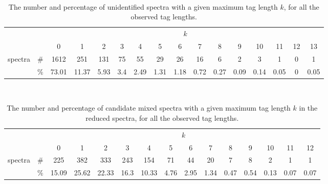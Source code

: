 \documentclass{article}
\begin{document}
\begin{table}[h]
\vspace{3mm}\
{\centering
\begin{center}
\begin{tabular}{|c|c|
c|c|c|c|c|c|c|c|c|c|c|c|c|c|}
  \hline
  \multicolumn{2}{|c|}{} & \multicolumn{ 14}{|c|}{$k$} \\
  \cline{3-16}
  \multicolumn{2}{|c|}{} 
 & 0 & 1 & 2 & 3 & 4 & 5 & 6 & 7 & 8 & 9 & 10 & 11 & 12 & 13\\
  \hline
  \multirow{2}{*}{spectra} & \#
 & 1612 & 251 & 131 & 75 & 55 & 29 & 26 & 16 & 6 & 2 & 3 & 1 & 0 & 1\\
   & \%
 & 73.01 & 11.37 & 5.93 & 3.4 & 2.49 & 1.31 & 1.18 & 0.72 & 0.27 & 0.09 & 0.14 & 0.05 & 0 & 0.05\\
  \hline
\end{tabular}
\end{center}
\par}
\centering
\caption{The number and percentage of unidentified spectra with a given maximum tag length $k$, for all the observed tag lengths.}
\vspace{3mm}
\label{table:unident-tags}
\end{table}
\begin{table}[h]
\vspace{3mm}\
{\centering
\begin{center}
\begin{tabular}{|c|c|
c|c|c|c|c|c|c|c|c|c|c|c|c|}
  \hline
  \multicolumn{2}{|c|}{} & \multicolumn{ 13}{|c|}{$k$} \\
  \cline{3-15}
  \multicolumn{2}{|c|}{} 
 & 0 & 1 & 2 & 3 & 4 & 5 & 6 & 7 & 8 & 9 & 10 & 11 & 12\\
  \hline
  \multirow{2}{*}{spectra} & \#
 & 225 & 382 & 333 & 243 & 154 & 71 & 44 & 20 & 7 & 8 & 2 & 1 & 1\\
   & \%
 & 15.09 & 25.62 & 22.33 & 16.3 & 10.33 & 4.76 & 2.95 & 1.34 & 0.47 & 0.54 & 0.13 & 0.07 & 0.07\\
  \hline
\end{tabular}
\end{center}
\par}
\centering
\caption{The number and percentage of candidate mixed spectra with a given maximum tag length $k$ in the reduced spectra, for all the observed tag lengths.}
\vspace{3mm}
\label{table:mixed-tags}
\end{table}
\end{document}
